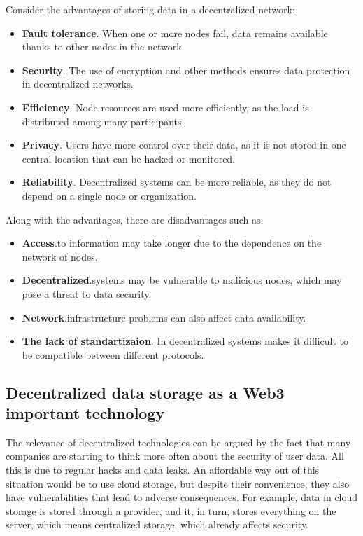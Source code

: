 \documentclass[10pt,conference,a4paper]{IEEEtran_EDM}
\begin{document}
Consider the advantages of storing data in a decentralized network:
\begin{itemize}
    \item \textbf{Fault tolerance}. When one or more nodes fail, data remains available thanks to other nodes in the network.
    \item \textbf{Security}. The use of encryption and other methods ensures data protection in decentralized networks.
    \item \textbf{Efficiency}. Node resources are used more efficiently, as the load is distributed among many participants.
    \item \textbf{Privacy}. Users have more control over their data, as it is not stored in one central location that can be hacked or monitored.
    \item \textbf{Reliability}. Decentralized systems can be more reliable, as they do not depend on a single node or organization.
\end{itemize}
Along with the advantages, there are disadvantages such as:
\begin{itemize}
    \item \textbf{Access}.to information may take longer due to the dependence on the network of nodes.
    \item \textbf{Decentralized}.systems may be vulnerable to malicious nodes, which may pose a threat to data security.
    \item \textbf{Network}.infrastructure problems can also affect data availability.
    \item \textbf{The lack of standartizaion}. In decentralized systems makes it difficult to be compatible between different protocols.
\end{itemize}

\subsection{Decentralized data storage as a Web3 important technology }

The relevance of decentralized technologies can be argued by the fact that many companies are starting to think more often about the security of user data. All this is due to regular hacks and data leaks. An affordable way out of this situation would be to use cloud storage, but despite their convenience, they also have vulnerabilities that lead to adverse consequences. For example, data in cloud storage is stored through a provider, and it, in turn, stores everything on the server, which means centralized storage, which already affects security.
\end{document}
